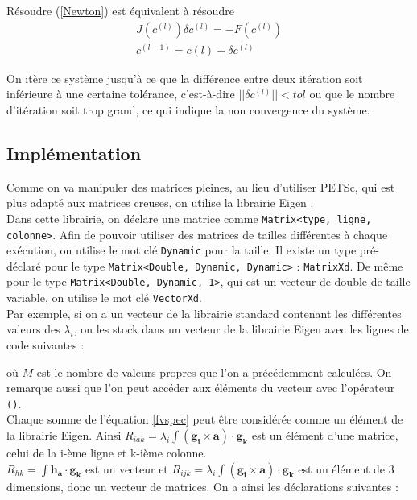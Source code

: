 Résoudre (\ref{Newton}) est équivalent à résoudre 
\begin{align}
J(c^{(l)})\delta c^{(l)} = -F(c^{(l)})\label{INewton1}\\
c^{(l+1)}=c{(l)}+\delta c^{(l)}\label{INewton2}
\end{align}

On itère ce système jusqu'à ce que la différence entre deux itération soit inférieure à une certaine tolérance, c'est-à-dire $||\delta c^{(l)}||<tol$ ou que le nombre d'itération soit trop grand, ce qui indique la non convergence du système.

\subsection{Implémentation}

Comme on va manipuler des matrices pleines, au lieu d'utiliser PETSc, qui est plus adapté aux matrices creuses, on utilise la librairie Eigen \cite{eigenweb}.\\
Dans cette librairie, on déclare une matrice comme \texttt{Matrix<type, ligne, colonne>}. Afin de pouvoir utiliser des matrices de tailles différentes à chaque exécution, on utilise le mot clé \texttt{Dynamic} pour la taille. Il existe un type pré-déclaré pour le type \texttt{Matrix<Double, Dynamic, Dynamic>} : \texttt{MatrixXd}. De même pour le type \texttt{Matrix<Double, Dynamic, 1>}, qui est un vecteur de double de taille variable, on utilise le mot clé \texttt{VectorXd}.\\

Par exemple, si on a un vecteur de la librairie standard contenant les différentes valeurs des $\lambda_i$, on les stock dans un vecteur de la librairie Eigen avec les lignes de code suivantes : 

où $M$ est le nombre de valeurs propres que l'on a précédemment calculées. On remarque aussi que l'on peut accéder aux éléments du vecteur avec l'opérateur \texttt{()}.\\

Chaque somme de l'équation \ref{fvspec} peut être considérée comme un élément de la librairie Eigen. Ainsi $R_{iak}=\lambda_i\int (\bm{g_i}\times\bm{a})\cdot\bm{g_k}$ est un élément d'une matrice, celui de la i-ème ligne et k-ième colonne.\\
$R_{hk} = \int \bm{h_a}\cdot\bm{g_k}$ est un vecteur et $R_{ijk} = \lambda_i\int (\bm{g_i}\times\bm{a})\cdot\bm{g_k}$ est un élément de 3 dimensions, donc un vecteur de matrices. On a ainsi les déclarations suivantes :\\


